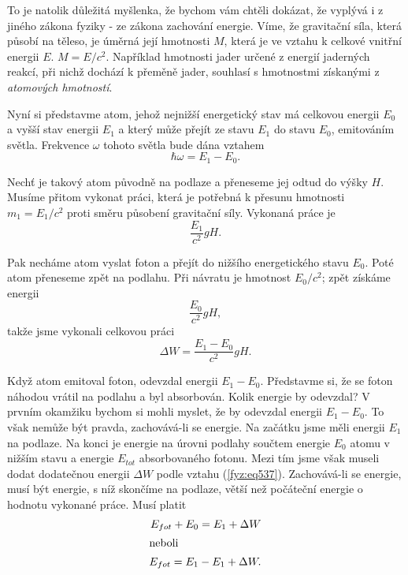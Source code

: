 {    To je natolik důležitá myšlenka, že bychom vám chtěli dokázat, že vyplývá i z jiného zákona 
    fyziky - ze zákona zachování energie. Víme, že gravitační síla, která působí na těleso, je 
    úměrná její hmotnosti \(M\), která je ve vztahu k celkové vnitřní energii \(E\). \(M=E/c^2\). 
    Například hmotnosti jader určené z energií jaderných reakcí, při nichž dochází k přeměně jader, 
    souhlasí s hmotnostmi získanými z \emph{atomových hmotností}.
    
    Nyní si představme atom, jehož nejnižší energetický stav má celkovou energii \(E_0\) a vyšší 
    stav energii \(E_1\) a který může přejít ze stavu \(E_1\) do stavu \(E_0\), emitováním světla. 
    Frekvence \(\omega\) tohoto světla bude dána vztahem
    \begin{equation}\label{fyz:eq534}
      \hbar\omega = E_1 - E_0.
    \end{equation}
    
    Nechť je takový atom původně na podlaze a přeneseme jej odtud do výšky \(H\). Musíme přitom 
    vykonat práci, která je potřebná k přesunu hmotnosti \(m_1 = E_1/c^2\) proti směru působení 
    gravitační síly. Vykonaná práce je
    \begin{equation}\label{fyz:eq535}
      \dfrac{E_1}{c^2}gH.
    \end{equation}
    
    Pak necháme atom vyslat foton a přejít do nižšího energetického stavu \(E_0\). Poté atom 
    přeneseme zpět na podlahu. Při návratu je hmotnost \(E_0/c^2\); zpět získáme energii
    \begin{equation}\label{fyz:eq536}
      \dfrac{E_0}{c^2}gH,
    \end{equation}
    takže jsme vykonali celkovou práci
    \begin{equation}\label{fyz:eq537}
      \Delta W = \dfrac{E_1 - E_0}{c^2}gH.
    \end{equation}
    
    Když atom emitoval foton, odevzdal energii \(E_1 - E_0\). Představme si, že se foton náhodou 
    vrátil na podlahu a byl absorbován. Kolik energie by odevzdal? V prvním okamžiku bychom si 
    mohli myslet, že by odevzdal energii \(E_1 - E_0\). To však nemůže být pravda, zachovává-li se 
    energie. Na začátku jsme měli energii \(E_1\) na podlaze. Na konci je energie na úrovni podlahy 
    součtem energie \(E_0\) atomu v nižším stavu a energie \(E_{tot}\) absorbovaného fotonu. Mezi 
    tím jsme však museli dodat dodatečnou energii \(\Delta W\) podle vztahu (\ref{fyz:eq537}). 
    Zachovává-li se energie, musí být energie, s níž skončíme na podlaze, větší než počáteční 
    energie o hodnotu vykonané práce. Musí platit
    \begin{subequations}
      \begin{align}
        E_{fot} + E_0 = E_1 + \Delta W       \label{fyz:eq538a}  \\
        \shortintertext{neboli}
        E_{fot} = E_1 - E_1 + \Delta W.      \label{fyz:eq538b}
      \end{align}
    \end{subequations}

}
